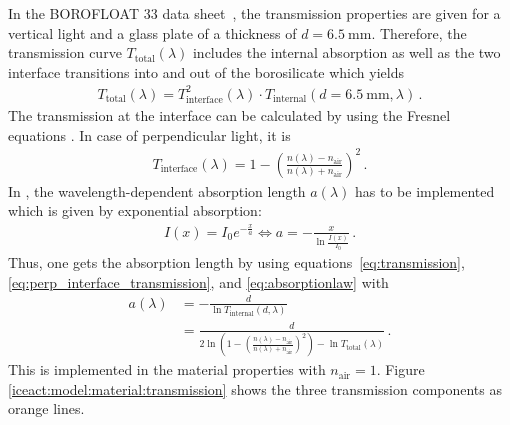In the BOROFLOAT\textsuperscript{\textregistered} 33 data sheet~\cite{iceact:borosilicate:datasheet}, the transmission properties are given for a vertical light and a glass plate of a thickness of $d = \SI{6.5}{\milli\meter}$. Therefore, the transmission curve $T_\text{total}(\lambda)$ includes the internal absorption as well as the two interface transitions into and out of the borosilicate which yields
\begin{align}
	T_\text{total}(\lambda) = T_\text{interface}^2(\lambda)\cdot T_\text{internal}(d=\SI{6.5}{\milli\meter},\lambda)\,.
	\label{eq:transmission}
\end{align}
The transmission at the interface can be calculated by using the Fresnel equations \cite{fresnel_equations}. In case of perpendicular light, it is
\begin{align}
	T_\text{interface}(\lambda) = 1 - \left(\frac{n(\lambda)-n_\text{air}}{n(\lambda)+n_\text{air}}\right)^2\,.
	\label{eq:perp_interface_transmission}
\end{align}
In \geant, the wavelength-dependent absorption length $a(\lambda)$ has to be implemented which is given by exponential absorption:
\begin{align}
	I(x) = I_0 e^{-\frac{x}{a}} \Leftrightarrow a = - \frac{x}{\ln{\frac{I(x)}{I_0}}}\,.
	\label{eq:absorptionlaw}
\end{align}
Thus, one gets the absorption length by using equations~\eqref{eq:transmission}, \eqref{eq:perp_interface_transmission}, and \eqref{eq:absorptionlaw} with
\begin{align}
	a(\lambda) &= - \frac{d}{\ln T_\text{internal}(d,\lambda)}\nonumber\\
	&= \frac{d}{2\ln\left(1 - \left(\frac{n(\lambda)-n_\text{air}}{n(\lambda)+n_\text{air}}\right)^2\right)-\ln T_\text{total}(\lambda)}\,.
\end{align}
This is implemented in the \geant material properties with $n_\text{air} = 1$. Figure \ref{iceact:model:material:transmission} shows the three transmission components as orange lines.\\

